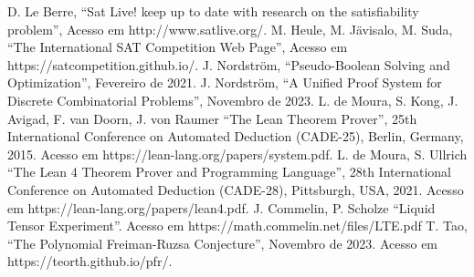 \documentclass[conference]{IEEEtran}
\begin{document}
\begin{thebibliography}{00}
           D. Le Berre, ``Sat Live! keep up to date with research on the satisfiability problem'', Acesso em http://www.satlive.org/.
           M. Heule, M. Jävisalo, M. Suda, ``The International SAT Competition Web Page'', Acesso em https://satcompetition.github.io/.
           J. Nordström, ``Pseudo-Boolean Solving and Optimization'', Fevereiro de 2021.
          J. Nordström, ``A Unified Proof System for Discrete Combinatorial Problems'', Novembro de 2023.
        L. de Moura, S. Kong, J. Avigad, F. van Doorn, J. von Raumer ``The Lean Theorem Prover'', 25th International Conference on Automated Deduction (CADE-25), Berlin, Germany, 2015. Acesso em https://lean-lang.org/papers/system.pdf.
             L. de Moura, S. Ullrich ``The Lean 4 Theorem Prover and Programming Language'', 28th International Conference on Automated Deduction (CADE-28), Pittsburgh, USA, 2021. Acesso em https://lean-lang.org/papers/lean4.pdf.
               J. Commelin, P. Scholze ``Liquid Tensor Experiment''. Acesso em https://math.commelin.net/files/LTE.pdf
               T. Tao, ``The Polynomial Freiman-Ruzsa Conjecture'', Novembro de 2023. Acesso em https://teorth.github.io/pfr/.

\end{thebibliography}
\vspace{12pt}
\end{document}
